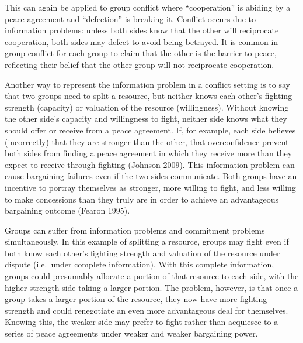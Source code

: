 \documentclass[11pt]{article}
\begin{document}
This can again be applied to group conflict where ``cooperation'' is
abiding by a peace agreement and ``defection'' is breaking it. Conflict
occurs due to information problems: unless both sides know that the
other will reciprocate cooperation, both sides may defect to avoid being
betrayed. It is common in group conflict for each group to claim that
the other is the barrier to peace, reflecting their belief that the
other group will not reciprocate cooperation.

Another way to represent the information problem in a conflict setting
is to say that two groups need to split a resource, but neither knows
each other's fighting strength (capacity) or valuation of the resource
(willingness). Without knowing the other side's capacity and willingness
to fight, neither side knows what they should offer or receive from a
peace agreement. If, for example, each side believes (incorrectly) that
they are stronger than the other, that overconfidence prevent both sides
from finding a peace agreement in which they receive more than they
expect to receive through fighting (Johnson 2009). This information
problem can cause bargaining failures even if the two sides communicate.
Both groups have an incentive to portray themselves as stronger, more
willing to fight, and less willing to make concessions than they truly
are in order to achieve an advantageous bargaining outcome (Fearon
1995).

Groups can suffer from information problems and commitment problems
simultaneously. In this example of splitting a resource, groups may
fight even if both know each other's fighting strength and valuation of
the resource under dispute (i.e.~under complete information). With this
complete information, groups could presumably allocate a portion of that
resource to each side, with the higher-strength side taking a larger
portion. The problem, however, is that once a group takes a larger
portion of the resource, they now have more fighting strength and could
renegotiate an even more advantageous deal for themselves. Knowing this,
the weaker side may prefer to fight rather than acquiesce to a series of
peace agreements under weaker and weaker bargaining power.\newline
\end{document}
